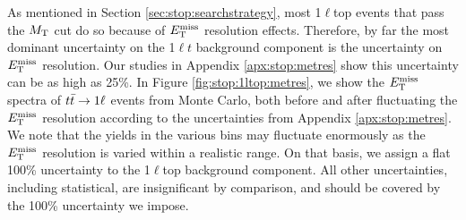 As mentioned in Section \ref{sec:stop:searchstrategy}, most 1$\ell$top
events that pass the $M_\text{T}$ cut do so because of $E_\text{T}^\text{miss}$ resolution
effects. Therefore, by far the most dominant uncertainty on the 1$\ell
t$ background component is the uncertainty on $E_\text{T}^\text{miss}$ resolution. Our
studies in Appendix \ref{apx:stop:metres} show this uncertainty can be as high as 25\%. In
Figure \ref{fig:stop:1ltop:metres}, we show the $E_\text{T}^\text{miss}$ spectra of
$t\bar{t} \rightarrow 1\ell$ events from Monte Carlo, both before and after fluctuating
the $E_\text{T}^\text{miss}$ resolution according to the uncertainties from
Appendix \ref{apx:stop:metres}. We note that the yields in the various bins may fluctuate
enormously as the $E_\text{T}^\text{miss}$ resolution is varied within a realistic range. On that
basis, we assign a flat 100\% uncertainty to the 1$\ell$top background
component. All other uncertainties, including statistical, are
insignificant by comparison, and should be covered by the 100\%
uncertainty we impose.

